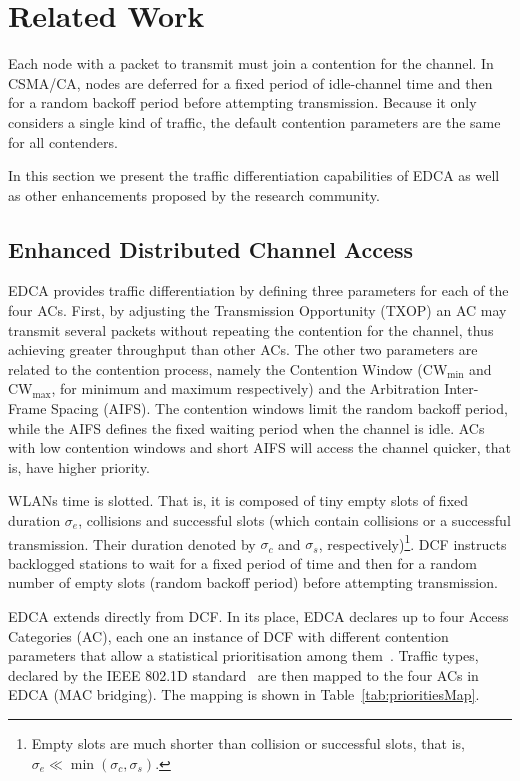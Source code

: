 \section{Related Work}\label{section2}
Each node with a packet to transmit must join a contention for the channel. In CSMA/CA, nodes are deferred for a fixed period of idle-channel time and then for a random backoff period before attempting transmission. Because it only considers a single kind of traffic, the default contention parameters are the same for all contenders. 

In this section we present the traffic differentiation capabilities of EDCA as well as other enhancements proposed by the research community.

\subsection{Enhanced Distributed Channel Access}\label{EDCA}
EDCA provides traffic differentiation by defining three parameters for each of the four ACs. First, by adjusting the Transmission Opportunity (TXOP) an AC may transmit several packets without repeating the contention for the channel, thus achieving greater throughput than other ACs. The other two parameters are related to the contention process, namely the Contention Window (CW$_{\min}$ and CW$_{\max}$, for minimum and maximum respectively) and the Arbitration Inter-Frame Spacing (AIFS). The contention windows limit the random backoff period, while the AIFS defines the fixed waiting period when the channel is idle. ACs with low contention windows and short AIFS will access the channel quicker, that is, have higher priority.

WLANs time is slotted. That is, it is composed of tiny empty slots of fixed duration $\sigma_{e}$, collisions and successful slots (which contain collisions or a successful transmission. Their duration denoted by $\sigma_{c}$ and $\sigma_{s}$, respectively)\footnote{Empty slots are much shorter than collision or successful slots, that is, $\sigma_{e}\ll\min(\sigma_{c},\sigma_{s})$.}. DCF instructs backlogged stations to wait for a fixed period of time and then for a random number of empty slots (random backoff period) before attempting transmission.

EDCA extends directly from DCF. In its place, EDCA declares up to four Access Categories (AC), each one an instance of DCF with different contention parameters that allow a statistical prioritisation among them~\cite{perahia2013next}. Traffic types, declared by the IEEE 802.1D standard~\cite{8021d} are then mapped to the four ACs in EDCA (MAC bridging). The mapping is shown in Table~\ref{tab:prioritiesMap}.

